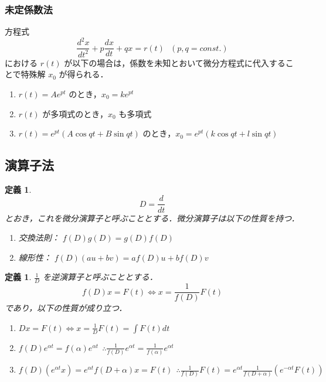 \documentclass[dvipdfmx, a4paper]{jsarticle}
\newtheorem{definition}[theorem]{定義}
\begin{document}
\subsubsection{未定係数法}

方程式
\begin{equation}
    \frac{d^2x}{dt^2}+p\frac{dx}{dt}+qx=r(t)\ \ \ (p, q=const.)
\end{equation}
における $r(t)$ が以下の場合は，係数を未知とおいて微分方程式に代入することで特殊解 $x_0$ が得られる．
\begin{enumerate}
    \item $r(t)=Ae^{pt}$ のとき，$x_0=ke^{pt}$
    \item $r(t)$ が多項式のとき，$x_0$ も多項式
    \item $r(t)=e^{pt}(A\cos qt+B\sin qt)$ のとき，$x_0=e^{pt}(k\cos qt+l\sin qt)$
\end{enumerate}

\subsection{演算子法}

\begin{definition}
    \begin{equation}
        D=\frac{d}{dt}
    \end{equation}
    とおき，これを微分演算子と呼ぶこととする．微分演算子は以下の性質を持つ．
    \begin{enumerate}
        \item 交換法則： $f(D)g(D)=g(D)f(D)$
        \item 線形性： $f(D)(au+bv)=af(D)u+bf(D)v$
    \end{enumerate}
\end{definition}

\begin{definition}
    $\frac{1}{D}$ を逆演算子と呼ぶこととする．
    \begin{equation}
        f(D)x=F(t)\Leftrightarrow x=\frac{1}{f(D)}F(t)
    \end{equation}
    であり，以下の性質が成り立つ．
    \begin{enumerate}
        \item $Dx=F(t)\Leftrightarrow x=\frac{1}{D}F(t)=\int F(t)dt$
        \item $f(D)e^{\alpha t}=f(\alpha)e^{\alpha t}\ \ \therefore \frac{1}{f(D)}e^{\alpha t}=\frac{1}{f(\alpha)}e^{\alpha t}$
        \item $f(D)(e^{\alpha t}x)=e^{\alpha t}f(D+\alpha)x=F(t)\ \ \therefore \frac{1}{f(D)}F(t)=e^{\alpha t}\frac{1}{f(D+\alpha)}(e^{-\alpha t}F(t))$
    \end{enumerate}
\end{definition}
\end{document}
